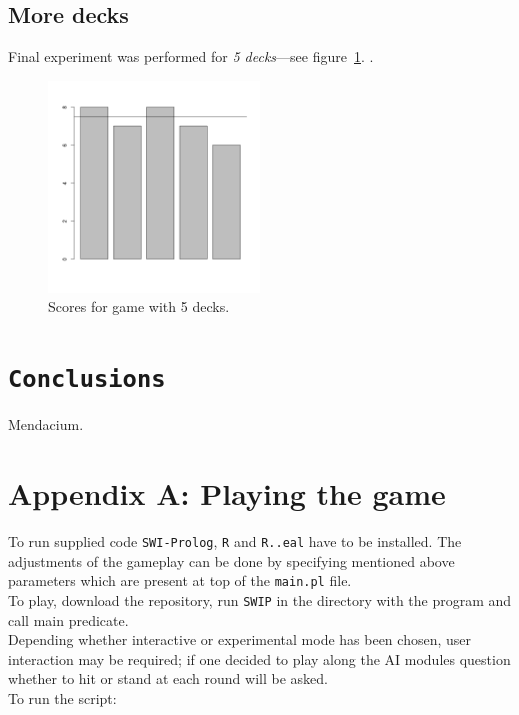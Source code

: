\documentclass[12pt,a4paper,twocolumn]{article}
\begin{document}
\subsection*{More decks}
Final experiment was performed for \emph{5 decks}---see figure~\ref{fig:5dec}. .\\

\begin{figure}[htbp]
\centering
\includegraphics[width=0.5\textwidth]{5decks}
\caption{Scores for game with 5 decks.\label{fig:5dec}}
\end{figure}


\section*{\texttt{Conclusions}}
Mendacium.



\cleardoublepage
\newpage
\section*{Appendix A: Playing the game}
To run supplied code \texttt{SWI-Prolog}, \texttt{R} and \texttt{R..eal} have to be installed. The adjustments of the gameplay can be done by specifying mentioned above parameters which are present at top of the \texttt{main.pl} file.\\



To play, download the repository, run \texttt{SWIP} in the directory with the program and call main predicate.\\
Depending whether interactive or experimental mode has been chosen, user interaction may be required; if one decided to play along the AI modules question whether to hit or stand at each round will be asked.\\

To run the script:
\end{document}
